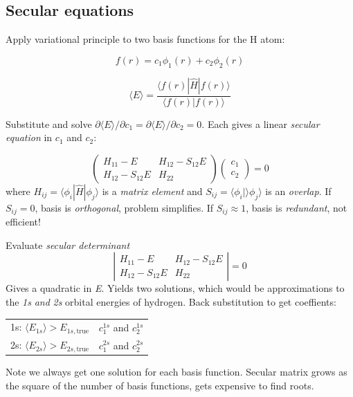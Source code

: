 \documentclass[11pt]{article}
\begin{document}
\subsection{Secular equations}
\label{sec:org470f1f8}
Apply variational principle to two basis functions for the H atom:

\[f(r) =c_1 \phi_1(r) + c_2\phi_2(r) \]

\[\langle E \rangle = \frac{\langle f(r)|\hat{H}|f(r)\rangle}{\langle f(r)|f(r)\rangle} \]

Substitute and solve \(\partial \langle E \rangle/\partial c_1 = \partial \langle E \rangle/\partial c_2 = 0\).  Each gives a linear \emph{secular equation} in \(c_1\) and \(c_2\):

\[
\left(\begin{array}{cc}
H_{11} - E & H_{12}-S_{12}E \\
H_{12}-S_{12}E & H_{22} 
\end{array}\right)\left(
\begin{array}{c} c_1 \\c_2\end{array}\right) =0
\]
where \(H_{ij} = \langle\phi_i|\hat{H}|\phi_j\rangle\) is a \emph{matrix element} and \(S_{ij}=\langle \phi_i | \rangle \phi_j \rangle\) is an \emph{overlap}.  If \(S_{ij} = 0\), basis is \emph{orthogonal}, problem simplifies.  If \(S_{ij}\approx 1\), basis is \emph{redundant}, not efficient!

Evaluate \emph{secular determinant} 
\[ \left| \begin{array}{cc} H_{11} - E & H_{12}-S_{12}E
\\ H_{12}-S_{12}E & H_{22} \end{array}\right| =0 \]
Gives a quadratic in \emph{E}.  Yields two solutions, which would be approximations to the \emph{1s} \emph{and} \emph{2s} orbital energies of hydrogen. Back substitution to get coeffients:

\begin{center}
\begin{tabular}{ll}
1s: \(\langle E_{1s}\rangle > E_{1s,\mathrm{true}}\) & \(c^{1s}_1\) and \(c^{1s}_2\)\\
2s: \(\langle E_{2s}\rangle > E_{2s,\mathrm{true}}\) & \(c^{2s}_1\) and \(c^{2s}_2\)\\
\end{tabular}
\end{center}

Note we always get one solution for each basis function.  Secular
matrix grows as the square of the number of basis functions, gets
expensive to find roots. 
\end{document}
